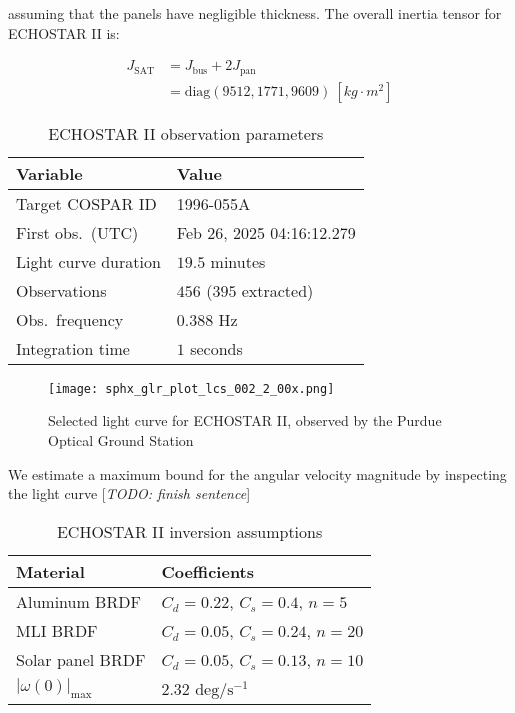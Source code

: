 \documentclass[a4paper,twocolumn]{spaceDebrisC} %
\newcommand{\figbig}[0]{0.5\textwidth}
\begin{document}
\noindent
assuming that the panels have negligible thickness. The overall inertia tensor for ECHOSTAR II is:

\begin{align}
 J_\text{SAT} &= J_\text{bus} + 2J_\text{pan} \\
  &= \text{diag} \left( 9512, 1771, 9609 \right) \: [kg \cdot m^2]
\end{align}


\begin{table}[ht]
  \centering
  \caption{ECHOSTAR II observation parameters}
  \vspace*{6pt}
  \begin{tabular}{|l|l|}
  \hline
  \textbf{Variable} & \textbf{Value} \\ \hline
  Target COSPAR ID & 1996-055A \\ \hline
  First obs.\ (UTC) & Feb 26, 2025 04:16:12.279 \\ \hline
  Light curve duration & $19.5$ minutes \\ \hline
  Observations & $456$ ($395$ extracted) \\ \hline
  Obs.\ frequency & $0.388$ Hz \\ \hline
  Integration time & $1$ seconds \\ \hline
  \end{tabular}
  \label{tb:case2_in}
\end{table}

\begin{figure}[ht]
  \centering
  \texttt{[image: sphx\_glr\_plot\_lcs\_002\_2\_00x.png]}
  \caption{Selected light curve for ECHOSTAR II, observed by the Purdue Optical Ground Station}
  \label{fig:sat_lc_obs}
\end{figure}

We estimate a maximum bound for the angular velocity magnitude by inspecting the light curve [\textit{TODO: finish sentence}]

\begin{table}[ht]
  \centering
  \caption{ECHOSTAR II inversion assumptions}
  \vspace*{6pt}
  \begin{tabular}{|l|l|}
  \hline
  \textbf{Material} & \textbf{Coefficients} \\ \hline
  Aluminum BRDF & $C_d=0.22$, $C_s=0.4$, $n=5$ \\ \hline
  MLI BRDF & $C_d=0.05$, $C_s=0.24$, $n=20$ \\ \hline
  Solar panel BRDF & $C_d=0.05$, $C_s=0.13$, $n=10$ \\ \hline
  $|\omega(0)|_\text{max}$ & $2.32$ $\text{deg} / \text{s}^{-1}$ \\ \hline
  \end{tabular}
  \label{tb:case2_ass}
\end{table}
\end{document}
